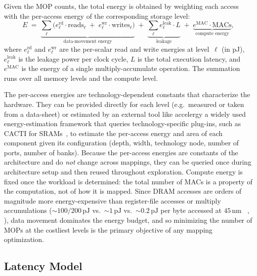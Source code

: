 Given the MOP counts, the total energy is obtained by weighting each
access with the per-access energy of the corresponding storage level:
\begin{equation}
\label{eq:energy}
E \;=\;
  \underbrace{\sum_{\ell}\bigl(
    e_{\ell}^{\text{rd}}\cdot\text{reads}_\ell \;+\;
    e_{\ell}^{\text{wr}}\cdot\text{writes}_\ell
  \bigr)}_{\text{data-movement energy}}
  \;+\;
  \underbrace{\sum_{\ell} e_{\ell}^{\text{leak}}\cdot L}_{\text{leakage}}
  \;+\;
  \underbrace{e^{\text{MAC}}\cdot\text{MACs}}_{\text{compute energy}},
\end{equation}
where $e_{\ell}^{\text{rd}}$ and $e_{\ell}^{\text{wr}}$ are the per-scalar
read and write energies at level~$\ell$ (in pJ), $e_{\ell}^{\text{leak}}$
is the leakage power per clock cycle, $L$ is the total execution latency,
and $e^{\text{MAC}}$ is the energy of a single multiply-accumulate operation.
The summation runs over all memory levels and the compute level.

The per-access energies are technology-dependent constants that characterize
the hardware.
They can be provided directly for each level (e.g.\ measured or taken from a
data-sheet) or estimated by an external tool like accelergy a widely used energy-estimation framework that queries technology-specific plug-ins, such as CACTI for
SRAMs~\cite{cacti}, to estimate the per-access energy and area of
each component given its configuration (depth, width, technology node, number
of ports, number of banks).
Because the per-access energies are constants of the architecture and do
\emph{not} change across mappings, they can be queried once during
architecture setup and then reused throughout exploration.
Compute energy is fixed once the workload is determined: the
total number of MACs is a property of the computation, not of how it is
mapped.
Since DRAM accesses are orders of magnitude more energy-expensive than
register-file accesses or multiply accumulations (${\sim}100/200\,\text{pJ}$ vs.\
${\sim}1\,\text{pJ}$ vs.\ ${\sim}0.2\,\text{pJ}$ per byte accessed at $45\,$nm%
~\cite{goetschalckx2023depfin}, \cite{wu2019accelergy}), data movement dominates the energy budget, and so
minimizing the number of MOPs at the costliest levels is the primary
objective of any mapping optimization.

\subsection{Latency Model}
\label{sec:latency-model}

